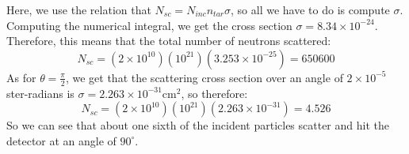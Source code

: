 \documentclass[10pt]{article}
\begin{document}
\begin{enumerate}[label=\alph*)]
			\begin{solution}
				Here, we use the relation that $N_{sc} = N_{inc}n_{tar} \sigma$, so all we have to do is 
				compute $\sigma$. Computing the numerical integral, we get the cross section $\sigma = 8.34
				\times 10^{-24}$. Therefore, this means that the total number of neutrons scattered: 
				\[
					N_{sc} = (2 \times 10^{10})(10^{21}) (3.253 \times 10^{-25}) = 650600
				\] 
				As for $\theta = \frac{\pi}{2}$, we get that the scattering cross section over an angle of 
				$2 \times 10^{-5}$ ster-radians is $\sigma = 2.263 \times 10^{-31} \text{cm}^2$, so therefore:
				\[
					N_{sc} = (2 \times 10^{10})(10^{21})(2.263 \times 10^{-31}) = 4.526
				\] 
				So we can see that about one sixth of the incident particles scatter and hit the detector
				at an angle of $90^\circ$.
			\end{solution}
	\end{enumerate}
	\pagebreak
\end{document}

